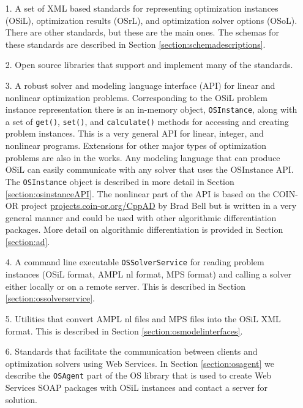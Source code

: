 \documentclass[11pt]{article}
\renewcommand{\_}{{\char"5F}}
\renewcommand{\{}{{\char"7B}}
\renewcommand{\}}{{\char"7D}}
\renewcommand{\^}{{\char"0D}}
\renewcommand{\'}{{\char"0D}}
\begin{document}
\begin{itemize}
\item[1.]  A set of XML based standards for representing optimization instances (OSiL), optimization results (OSrL), and optimization solver options (OSoL). There are other standards, but these are the main ones. The schemas for these standards are described in Section   \ref{section:schemadescriptions}.


\item[2.]  Open source libraries  that support and implement many of the standards.

\item[3.]  A robust solver and modeling language interface (API) for linear and nonlinear optimization problems.  Corresponding to the OSiL problem instance representation there is an in-memory object,  {\tt OSInstance}, along with a set of  {\tt get()},   {\tt set()}, and {\tt calculate()} methods for accessing and creating problem instances.
This is a very general API for linear, integer, and nonlinear programs. Extensions for other major types of optimization problems are also in the works. Any modeling language that can produce OSiL can easily communicate with any solver that uses the OSInstance API.   The {\tt OSInstance} object is described in more detail in Section \ref{section:osinstanceAPI}. The nonlinear part of the API is based on the COIN-OR project \url{projects.coin-or.org/CppAD} by Brad Bell but is written in a very general manner and could be used with other algorithmic differentiation packages. More detail on algorithmic differentiation is provided in Section \ref{section:ad}.


\item[4.]  A  command line executable {\tt OSSolverService}  for reading problem instances (OSiL format, AMPL  nl format,  MPS format) and calling a solver either locally or on a remote server.  This is described in Section \ref{section:ossolverservice}.


\item[5.] Utilities that convert AMPL nl files  and MPS files into the OSiL XML format.  This is described in Section \ref{section:osmodelinterfaces}.


\item[6.]  Standards that facilitate the communication between clients and optimization solvers using Web Services.  In  Section \ref{section:osagent} we describe the {\tt OSAgent} part of the OS library that is used to create Web Services
 SOAP packages with OSiL instances and contact a server for solution.


\end{itemize}
\end{document}
